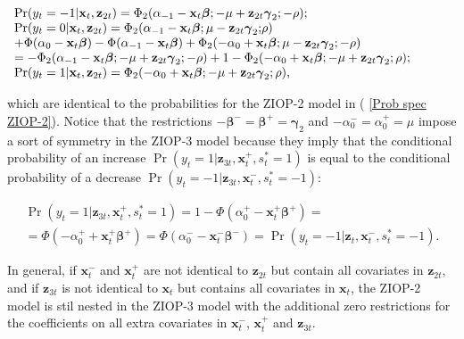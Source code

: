 \documentclass[letterpaper,fleqn,12pt]{article}
\begin{document}
\begin{onehalfspace}
\bigskip 

$%
\begin{array}{l}
\Pr (y_{t}=-1|\mathbf{x}_{t},\mathbf{z}_{2t})=\Phi _{2}(\alpha _{-1}-\mathbf{%
x}_{t}\mathbf{\beta };-\mu +\mathbf{z}_{2t}\mathbf{\gamma }_{2}\mathbf{;-}%
\rho ); \\ 
\Pr (y_{t}=0|\mathbf{x}_{t},\mathbf{z}_{2t})=\Phi _{2}(\alpha _{-1}-\mathbf{x%
}_{t}\mathbf{\beta };\mu -\mathbf{z}_{2t}\mathbf{\gamma }_{2}\mathbf{;}\rho )
\\ 
+\Phi (\alpha _{0}-\mathbf{x}_{t}\mathbf{\beta })-\Phi (\alpha _{-1}-\mathbf{%
x}_{t}\mathbf{\beta })+\Phi _{2}(-\alpha _{0}+\mathbf{x}_{t}\mathbf{\beta }%
;\mu -\mathbf{z}_{2t}\mathbf{\gamma }_{2};\mathbf{-}\rho ) \\ 
=-\Phi _{2}(\alpha _{-1}-\mathbf{x}_{t}\mathbf{\beta };-\mu +\mathbf{z}_{2t}%
\mathbf{\gamma }_{2}\mathbf{;-}\rho )+1-\Phi _{2}(-\alpha _{0}+\mathbf{x}_{t}%
\mathbf{\beta };-\mu +\mathbf{z}_{2t}\mathbf{\gamma }_{2};\rho ); \\ 
\Pr (y_{t}=1|\mathbf{x}_{t},\mathbf{z}_{2t})=\Phi _{2}(-\alpha _{0}+\mathbf{x%
}_{t}\mathbf{\beta };-\mu +\mathbf{z}_{2t}\mathbf{\gamma }_{2};\rho ),%
\end{array}%
$

\bigskip 

\noindent which are identical to the probabilities for the ZIOP-2 model in (%
\ref{Prob spec ZIOP-2}). Notice that the restrictions $-\mathbf{\beta }^{-}=%
\mathbf{\beta }^{+}=\mathbf{\gamma }_{2}$ and $-\alpha _{0}^{-}=\alpha
_{0}^{+}=\mu $ impose a sort of symmetry in the ZIOP-3 model because they
imply that the conditional probability of an increase $\Pr (y_{t}=1|\mathbf{z%
}_{3t},\mathbf{x}_{t}^{+},s_{t}^{\ast }=1)$ is equal to the conditional
probability of a decrease $\Pr (y_{t}=-1|\mathbf{z}_{3t},\mathbf{x}%
_{t}^{-},s_{t}^{\ast }=-1)$:

\medskip 

\begin{gather*}
\Pr (y_{t}=1|\mathbf{z}_{3t},\mathbf{x}_{t}^{+},s_{t}^{\ast }=1)=1-\Phi
(\alpha _{0}^{+}-\mathbf{x}_{t}^{+}\mathbf{\beta }^{+})= \\
=\Phi (-\alpha _{0}^{+}+\mathbf{x}_{t}^{+}\mathbf{\beta }^{+})=\Phi (\alpha
_{0}^{-}-\mathbf{x}_{t}^{-}\mathbf{\beta }^{-})=\Pr (y_{t}=-1|\mathbf{z}_{t},%
\mathbf{x}_{t}^{-},s_{t}^{\ast }=-1)\text{.}
\end{gather*}

\medskip 

In general, if $\mathbf{x}_{t}^{-}$ and $\mathbf{x}_{t}^{+}$ are not
identical to $\mathbf{z}_{2t}$ but contain all covariates in $\mathbf{z}_{2t}
$, and if $\mathbf{z}_{3t}$ is not identical to $\mathbf{x}_{t}$ but
contains all covariates in $\mathbf{x}_{t}$, the ZIOP-2 model is stil nested
in the ZIOP-3 model with the additional zero restrictions for the
coefficients on all extra covariates in $\mathbf{x}_{t}^{-}$, $\mathbf{x}%
_{t}^{+}$ and $\mathbf{z}_{3t}$.


\end{onehalfspace}
\end{document}
